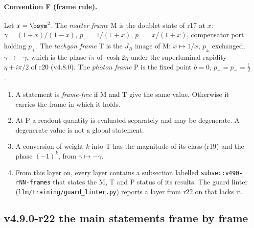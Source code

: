 \paragraph{Convention F (frame rule).}
Let \(x=\bsym^2\).  The \emph{matter frame} M is the doublet state of r17 at \(x\): \(\gamma=(1+x)/(1-x)\),
\(p_+=1/(1+x)\), \(p_-=x/(1+x)\), compensator port holding \(p_+\).  The \emph{tachyon frame} T is the \(J_B\) image of M:
\(x\mapsto1/x\), \(p_\pm\) exchanged, \(\gamma\mapsto-\gamma\), which is the phase \(i\pi\) of \(\cosh2\eta\) under the superluminal
rapidity \(\eta+i\pi/2\) of r20 (v4.8.0).  The \emph{photon frame} P is the fixed point \(b=0\), \(p_+=p_-=\tfrac12\).
\begin{enumerate}[leftmargin=2em]
\item[(F1)] A statement is \emph{frame-free} if M and T give the same value.  Otherwise it carries the frame in which it holds.
\item[(F2)] At P a readout quantity is evaluated separately and may be degenerate.  A degenerate value is not a global statement.
\item[(F3)] A conversion of weight \(k\) into T has the magnitude of its class (r19) and the phase \((-1)^k\), from \(\gamma\mapsto-\gamma\).
\item[(F4)] From this layer on, every layer contains a subsection labelled \texttt{subsec:v490-rNN-frames} that states the M, T and P
status of its results.  The guard linter (\texttt{llm/training/guard\_linter.py}) reports a layer from r22 on that lacks it.
\end{enumerate}

\subsection*{v4.9.0-r22 the main statements frame by frame}
\label{subsec:v490-r22-statements}

